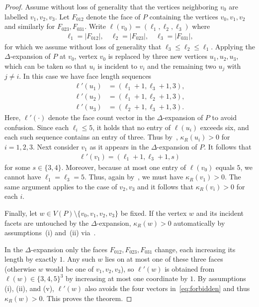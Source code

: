\documentclass[11pt,a4paper]{amsart}
\newcommand{\resistance}[1]{\kappa_R\left({#1}\right)}
\begin{document}
\begin{proof}
    Assume without loss of generality that the vertices neighboring $v_0$ are labelled $v_1, v_2, v_3$. Let $F_{012}$ denote the face of $P$ containing the vertices $v_0, v_1, v_2$ and similarly for $F_{023}, F_{031}$. Write $\boldsymbol{\ell}(v_0) = (\ell_1, \ell_2, \ell_3)$ where
        \begin{align*}
            \ell_1 = |F_{012}|,\quad \ell_2 = |F_{023}|,\quad \ell_3 = |F_{031}|,
        \end{align*}
    for which we assume without loss of generality that $\ell_3\leq \ell_2\leq \ell_1$. Applying the $\Delta$-expansion of $P$ at $v_0$, vertex $v_0$ is replaced by three new vertices $u_1, u_2, u_3$, which can be taken so that $u_i$ is incident to $v_i$ and the remaining two $u_j$ with $j\neq i$. In this case we have face length sequences
        \begin{align*}
            \boldsymbol{\ell}'(u_1) &= (\ell_1+1, \ell_3+1, 3),\\
            \boldsymbol{\ell}'(u_2) &= (\ell_1+1, \ell_2+1, 3),\\
            \boldsymbol{\ell}'(u_3) &= (\ell_2+1, \ell_3+1, 3).
        \end{align*}
    Here, $\boldsymbol{\ell}'(\cdot)$ denote the face count vector in the $\Delta$-expansion of $P$ to avoid confusion. Since each $\ell_i\leq 5$, it holds that no entry of $\boldsymbol{\ell}(u_i)$ exceeds six, and each such sequence contains an entry of three. Thus by~, $\resistance{u_i} > 0$ for $i=1, 2, 3$. Next consider $v_1$ as it appears in the $\Delta$-expansion of $P$. It follows that
        \begin{align*}
            \boldsymbol{\ell}'(v_1) = (\ell_1+1, \ell_3+1, s)
        \end{align*}
    for some $s\in \{3, 4\}$. Moreover, because at most one entry of $\boldsymbol{\ell}(v_0)$ equals $5$, we cannot have $\ell_1=\ell_3=5$. Thus, again by~, we must have $\resistance{v_1} > 0$. The same argument applies to the case of $v_2, v_3$ and it follows that $\resistance{v_i} > 0$ for each $i$.

    Finally, let $w\in V(P)\setminus\{v_0,v_1,v_2,v_3\}$ be fixed. If the vertex $w$ and its incident facets are untouched by the $\Delta$-expansion, $\resistance{w} > 0$ automatically by assumptions~(i) and~(ii) via~.
    
    In the $\Delta$-expansion only the faces $F_{012},F_{023},F_{031}$ change, each increasing its length by exactly $1$. Any such $w$ lies on at most one of these three faces (otherwise $w$ would be one of $v_1,v_2,v_3$), so $\boldsymbol{\ell}'(w)$ is obtained from $\boldsymbol{\ell}(w)\in\{3,4,5\}^3$ by increasing at most one coordinate by $1$. By assumptions (i), (ii), and (v), $\boldsymbol{\ell}'(w)$ also avoids the four vectors in~\eqref{eq:forbidden} and thus $\resistance{w}>0$. This proves the theorem.
\end{proof}
\end{document}
